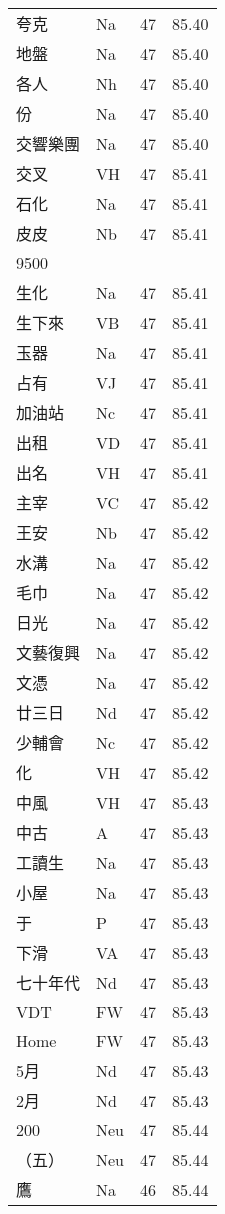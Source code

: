 \documentclass[twocolumn]{book}
\begin{document}
\begin{supertabular}{llrr}
夸克 & Na & 47 &  85.40\\
地盤 & Na & 47 &  85.40\\
各人 & Nh & 47 &  85.40\\
份 & Na & 47 &  85.40\\
交響樂團 & Na & 47 &  85.40\\
交叉 & VH & 47 &  85.41\\
石化 & Na & 47 &  85.41\\
皮皮 & Nb & 47 &  85.41\\
9500\\
生化 & Na & 47 &  85.41\\
生下來 & VB & 47 &  85.41\\
玉器 & Na & 47 &  85.41\\
占有 & VJ & 47 &  85.41\\
加油站 & Nc & 47 &  85.41\\
出租 & VD & 47 &  85.41\\
出名 & VH & 47 &  85.41\\
主宰 & VC & 47 &  85.42\\
王安 & Nb & 47 &  85.42\\
水溝 & Na & 47 &  85.42\\
毛巾 & Na & 47 &  85.42\\
日光 & Na & 47 &  85.42\\
文藝復興 & Na & 47 &  85.42\\
文憑 & Na & 47 &  85.42\\
廿三日 & Nd & 47 &  85.42\\
少輔會 & Nc & 47 &  85.42\\
化 & VH & 47 &  85.42\\
中風 & VH & 47 &  85.43\\
中古 & A & 47 &  85.43\\
工讀生 & Na & 47 &  85.43\\
小屋 & Na & 47 &  85.43\\
于 & P & 47 &  85.43\\
下滑 & VA & 47 &  85.43\\
七十年代 & Nd & 47 &  85.43\\
VDT & FW & 47 &  85.43\\
Home & FW & 47 &  85.43\\
5月 & Nd & 47 &  85.43\\
2月 & Nd & 47 &  85.43\\
200 & Neu & 47 &  85.44\\
（五） & Neu & 47 &  85.44\\
鷹 & Na & 46 &  85.44\\

\end{supertabular}
\end{document}
